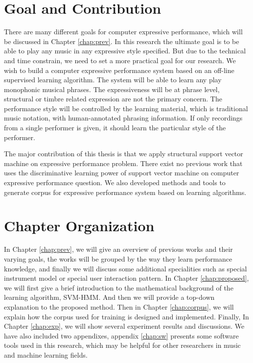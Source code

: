 
%



\section{Goal and Contribution}
There are many different goals for computer expressive performance, which will be discussed in Chapter \ref{chap:prev}. In this research the ultimate goal is to be able to play any music in any expressive style specified. But due to the technical and time constrain, we need to set a more practical goal for our research. We wish to build a computer expressive performance system based on an off-line supervised learning algorithm. The system will be able to learn any play monophonic musical phrases. The expressiveness will be at phrase level, structural or timbre related expression are not the primary concern. The performance style will be controlled by the learning material, which is traditional music notation, with human-annotated phrasing information. If only recordings from a single performer is given, it should learn the particular style of the performer.


The major contribution of this thesis is that we apply structural support vector machine on expressive performance problem. There exist no previous work that uses the discriminative learning power of support vector machine on computer expressive performance question. We also developed methods and tools to generate corpus for expressive performance system based on learning algorithms. 
%
%
\section{Chapter Organization}
In Chapter \ref{chap:prev}, we will give an overview of previous works and their varying goals, the works will be grouped by the way they learn performance knowledge, and finally we will discuss some additional specialities such as special instrument model or special user interaction pattern. In Chapter \ref{chap:proposed}, we will first give a brief introduction to the mathematical background of the learning algorithm, SVM-HMM. And then we will provide a top-down explanation to the proposed method. Then in Chapter \ref{chap:corpus}, we will explain how the corpus used for training is designed and implemented. Finally, In Chapter \ref{chap:exp}, we will show several experiment results and discussions. We have also included two appendixes, appendix \ref{chap:sw} presents some software tools used in this research, which may be helpful for other researchers in music and machine learning fields.
